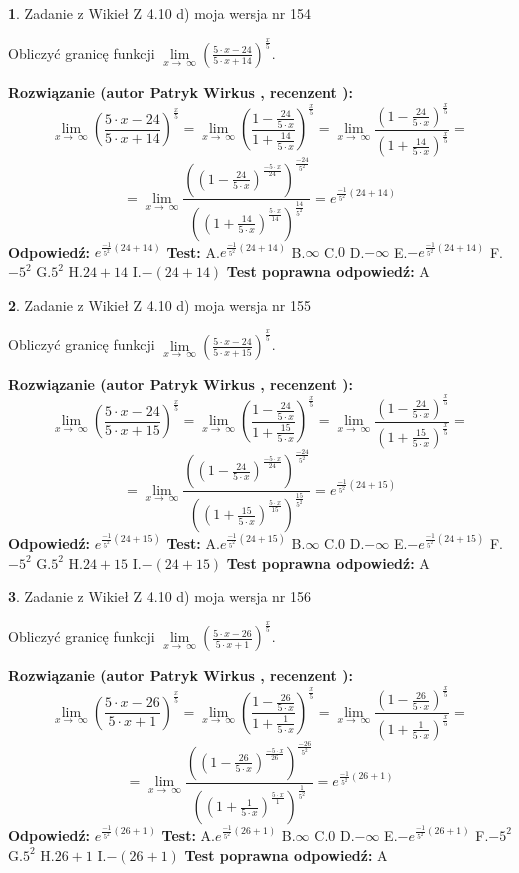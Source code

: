 \documentclass[12pt, a4paper]{article}
\theoremstyle{definition} %
\newtheorem{zad}{}
\newcommand{\zadStart}[1]{\begin{zad}#1\newline}
\newcommand{\zadStop}{\end{zad}}
\newcommand{\rozwStart}[2]{\noindent \textbf{Rozwiązanie (autor #1 , recenzent #2): }\newline}
\newcommand{\rozwStop}{\newline}
\newcommand{\odpStart}{\noindent \textbf{Odpowiedź:}\newline}
\newcommand{\odpStop}{\newline}
\newcommand{\testStart}{\noindent \textbf{Test:}\newline}
\newcommand{\testStop}{\newline}
\newcommand{\kluczStart}{\noindent \textbf{Test poprawna odpowiedź:}\newline}
\newcommand{\kluczStop}{\newline}
\begin{document}
\zadStart{Zadanie z Wikieł Z 4.10 d) moja wersja nr 154}


Obliczyć granicę funkcji  $\lim\limits_{x\to\ \infty}(\frac{5\cdot x-24}{5\cdot x+14})^{\frac{x}{5}}$.
\zadStop
\rozwStart{Patryk Wirkus}{}
$$\lim\limits_{x\to\ \infty}(\frac{5\cdot x-24}{5\cdot x+14})^{\frac{x}{5}} = \lim\limits_{x\to\ \infty}(\frac{1-\frac{24}{5\cdot x}}{1+\frac{14}{5\cdot x}})^{\frac{x}{5}}=\lim\limits_{x\to\ \infty}\frac{(1-\frac{24}{5\cdot x})^{\frac{x}{5}}}{(1+\frac{14}{5\cdot x})^{\frac{x}{5}}}=$$
$$=\lim\limits_{x\to\ \infty}\frac{((1-\frac{24}{5\cdot x})^{\frac{-5\cdot x}{24}})^{\frac{-24}{5^{2}}}}{((1+\frac{14}{5\cdot x})^{\frac{5\cdot x}{14}})^{\frac{14}{5^{2}}}}=e^{\frac{-1}{5^{2}}(24+14)}$$
\rozwStop
\odpStart
$e^{\frac{-1}{5^{2}}(24+14)}$
\odpStop
\testStart
A.$e^{\frac{-1}{5^{2}}(24+14)}$ B.$\infty$ C.$0$ D.$-\infty$ E.$-e^{\frac{-1}{5^{2}}(24+14)}$
F.$-5^{2}$ G.$5^{2}$
H.$24+14$
I.$-(24+14)$
\testStop
\kluczStart
A
\kluczStop



\zadStart{Zadanie z Wikieł Z 4.10 d) moja wersja nr 155}


Obliczyć granicę funkcji  $\lim\limits_{x\to\ \infty}(\frac{5\cdot x-24}{5\cdot x+15})^{\frac{x}{5}}$.
\zadStop
\rozwStart{Patryk Wirkus}{}
$$\lim\limits_{x\to\ \infty}(\frac{5\cdot x-24}{5\cdot x+15})^{\frac{x}{5}} = \lim\limits_{x\to\ \infty}(\frac{1-\frac{24}{5\cdot x}}{1+\frac{15}{5\cdot x}})^{\frac{x}{5}}=\lim\limits_{x\to\ \infty}\frac{(1-\frac{24}{5\cdot x})^{\frac{x}{5}}}{(1+\frac{15}{5\cdot x})^{\frac{x}{5}}}=$$
$$=\lim\limits_{x\to\ \infty}\frac{((1-\frac{24}{5\cdot x})^{\frac{-5\cdot x}{24}})^{\frac{-24}{5^{2}}}}{((1+\frac{15}{5\cdot x})^{\frac{5\cdot x}{15}})^{\frac{15}{5^{2}}}}=e^{\frac{-1}{5^{2}}(24+15)}$$
\rozwStop
\odpStart
$e^{\frac{-1}{5^{2}}(24+15)}$
\odpStop
\testStart
A.$e^{\frac{-1}{5^{2}}(24+15)}$ B.$\infty$ C.$0$ D.$-\infty$ E.$-e^{\frac{-1}{5^{2}}(24+15)}$
F.$-5^{2}$ G.$5^{2}$
H.$24+15$
I.$-(24+15)$
\testStop
\kluczStart
A
\kluczStop



\zadStart{Zadanie z Wikieł Z 4.10 d) moja wersja nr 156}


Obliczyć granicę funkcji  $\lim\limits_{x\to\ \infty}(\frac{5\cdot x-26}{5\cdot x+1})^{\frac{x}{5}}$.
\zadStop
\rozwStart{Patryk Wirkus}{}
$$\lim\limits_{x\to\ \infty}(\frac{5\cdot x-26}{5\cdot x+1})^{\frac{x}{5}} = \lim\limits_{x\to\ \infty}(\frac{1-\frac{26}{5\cdot x}}{1+\frac{1}{5\cdot x}})^{\frac{x}{5}}=\lim\limits_{x\to\ \infty}\frac{(1-\frac{26}{5\cdot x})^{\frac{x}{5}}}{(1+\frac{1}{5\cdot x})^{\frac{x}{5}}}=$$
$$=\lim\limits_{x\to\ \infty}\frac{((1-\frac{26}{5\cdot x})^{\frac{-5\cdot x}{26}})^{\frac{-26}{5^{2}}}}{((1+\frac{1}{5\cdot x})^{\frac{5\cdot x}{1}})^{\frac{1}{5^{2}}}}=e^{\frac{-1}{5^{2}}(26+1)}$$
\rozwStop
\odpStart
$e^{\frac{-1}{5^{2}}(26+1)}$
\odpStop
\testStart
A.$e^{\frac{-1}{5^{2}}(26+1)}$ B.$\infty$ C.$0$ D.$-\infty$ E.$-e^{\frac{-1}{5^{2}}(26+1)}$
F.$-5^{2}$ G.$5^{2}$
H.$26+1$
I.$-(26+1)$
\testStop
\kluczStart
A
\kluczStop
\end{document}
